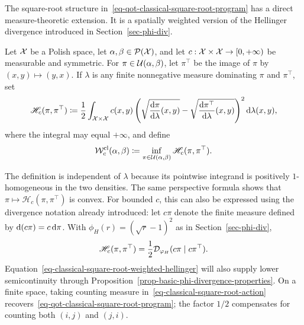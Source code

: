 The square-root structure in~\eqref{eq-qot-classical-square-root-program} has a direct measure-theoretic extension. It is a spatially weighted version of the Hellinger divergence introduced in Section~\ref{sec-phi-div}.

\begin{defn}\label{def-classical-square-root-transport}
	Let $\mathcal{X}$ be a Polish space, let $\alpha,\beta\in\mathcal{P}(\mathcal{X})$, and let $c:\mathcal{X}\times\mathcal{X}\to[0,+\infty)$ be measurable and symmetric. For $\pi\in\mathcal{U}(\alpha,\beta)$, let $\pi^\top$ be the image of $\pi$ by $(x,y)\mapsto(y,x)$. If $\lambda$ is any finite nonnegative measure dominating $\pi$ and $\pi^\top$, set
	\begin{equation}\label{eq-classical-square-root-action}
		\mathscr H_c(\pi,\pi^\top)
		\coloneqq
		\frac12\int_{\mathcal{X}\times\mathcal{X}}c(x,y)
		\left(
			\sqrt{\frac{\mathrm{d}\pi}{\mathrm{d}\lambda}(x,y)}
			-
			\sqrt{\frac{\mathrm{d}\pi^\top}{\mathrm{d}\lambda}(x,y)}
		\right)^2\mathrm{d}\lambda(x,y),
	\end{equation}
	where the integral may equal $+\infty$, and define
	\begin{equation}\label{eq-classical-square-root-transport}
		\mathcal W_c^{\mathrm{cl}}(\alpha,\beta)
		\coloneqq
		\inf_{\pi\in\mathcal{U}(\alpha,\beta)}\mathscr H_c(\pi,\pi^\top).
	\end{equation}
\end{defn}

The definition is independent of $\lambda$ because its pointwise integrand is positively $1$-homogeneous in the two densities. The same perspective formula shows that $\pi\mapsto\mathscr H_c(\pi,\pi^\top)$ is convex. For bounded $c$, this can also be expressed using the divergence notation already introduced: let $c\pi$ denote the finite measure defined by $\mathrm{d}(c\pi)=c\,\mathrm{d}\pi$. With $\phi_H(r)=(\sqrt r-1)^2$ as in Section~\ref{sec-phi-div},
\begin{equation}\label{eq-classical-square-root-weighted-hellinger}
	\mathscr H_c(\pi,\pi^\top)
	=\frac12\mathcal{D}_{\varphi_H}(c\pi\mid c\pi^\top).
\end{equation}
Equation~\eqref{eq-classical-square-root-weighted-hellinger} will also supply lower semicontinuity through Proposition~\ref{prop-basic-phi-divergence-properties}. On a finite space, taking counting measure in~\eqref{eq-classical-square-root-action} recovers~\eqref{eq-qot-classical-square-root-program}; the factor $1/2$ compensates for counting both $(i,j)$ and $(j,i)$.

